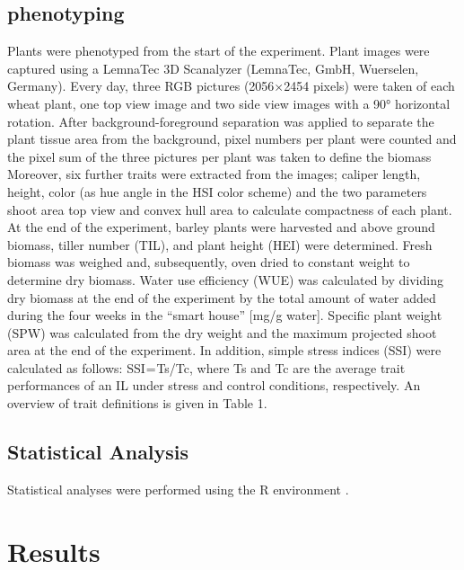 \documentclass{frontiersSCNS} %
\begin{document}
\subsection{phenotyping}
Plants were phenotyped from the start of the experiment. Plant images were captured using a LemnaTec 3D Scanalyzer (LemnaTec, GmbH, Wuerselen, Germany). Every day, three RGB pictures (2056×2454 pixels) were taken of each wheat plant, one top view image and two side view images with a 90° horizontal rotation. After background-foreground separation was applied to separate the plant tissue area from the background, pixel numbers per plant were counted and the pixel sum of the three pictures per plant was taken to define the biomass %
Moreover, six further traits were extracted from the images; caliper length, height, color (as hue angle in the HSI color scheme) and the two parameters shoot area top view and convex hull area to calculate compactness of each plant. At the end of the experiment, barley plants were harvested and above ground biomass, tiller number (TIL), and plant height (HEI) were determined. Fresh biomass was weighed and, subsequently, oven dried to constant weight to determine dry biomass. Water use efficiency (WUE) was calculated by dividing dry biomass at the end of the experiment by the total amount of water added during the four weeks in the “smart house” [mg/g water]. Specific plant weight (SPW) was calculated from the dry weight and the maximum projected shoot area at the end of the experiment. In addition, simple stress indices (SSI) were calculated as follows: SSI = Ts/Tc, where Ts and Tc are the average trait performances of an IL under stress and control conditions, respectively. An overview of trait definitions is given in Table 1.
\subsection{Statistical Analysis}
Statistical analyses were performed using the R environment \cite{RManual}. 

\section{Results}
\end{document}
